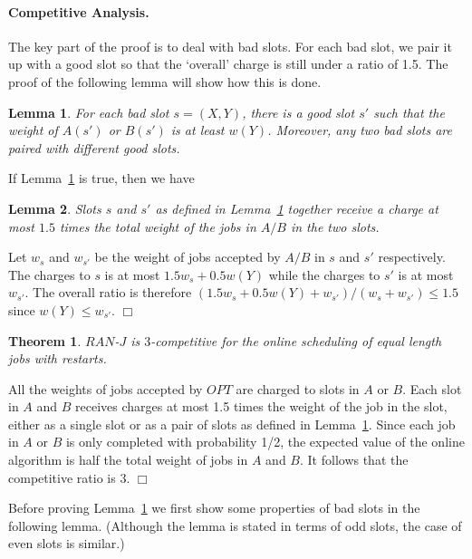 \documentclass[11pt]{article}
\newtheorem{theorem}{Theorem}[section]
\newtheorem{lemma}{Lemma}[section]
\newcommand{\qed}{\hspace*{\fill}$\Box$\par\medskip}
\newenvironment{proof}{\noindent{\it Proof. }\ignorespaces}{\qed}
\begin{document}
\paragraph{Competitive Analysis.}

The key part of the proof is to deal with bad slots.
For each bad slot, we pair it up with a good slot 
so that the `overall' charge is still under a ratio of 1.5.
The proof of the following lemma will show how this is done. 


\begin{lemma} \label{lem:match-slots}
For each bad slot $s=(X,Y)$, there is a good slot $s'$ such that 
the weight of $A(s')$ or $B(s')$ is at least $w(Y)$.  
Moreover, any two bad slots are paired with different good slots.
\end{lemma}

If Lemma~\ref{lem:match-slots} is true, then we have

\begin{lemma}
Slots $s$ and $s'$ as defined in Lemma~\ref{lem:match-slots} together 
receive a charge at most $1.5$ times the total weight of the jobs in $A/B$
in the two slots.
\end{lemma}
\begin{proof}
Let $w_s$ and $w_{s'}$ be the weight of jobs accepted by $A/B$ in $s$ and $s'$
respectively.
The charges to $s$ is at most $1.5w_s + 0.5w(Y)$ while the charges to $s'$
is at most $w_{s'}$.  The overall ratio is therefore
$(1.5w_s + 0.5w(Y) + w_{s'})/(w_s + w_{s'}) \le 1.5$
since $w(Y) \le w_{s'}$. 
\end{proof}

\begin{theorem}
$RAN$-$J$ is $3$-competitive for the online scheduling of equal length jobs 
with restarts.
\end{theorem}
\begin{proof}
All the weights of jobs accepted by $OPT$ 
are charged to slots in $A$ or $B$.
Each slot in $A$ and $B$ receives charges at most 1.5 times the weight
of the job in the slot,
either as a single slot or as a pair of slots as defined in 
Lemma~\ref{lem:match-slots}.  
Since each job in $A$ or $B$ is only completed 
with probability 1/2, the expected value of the online algorithm is half the
total weight of jobs in $A$ and $B$.  
It follows that the competitive ratio is 3. 
\end{proof}

Before proving Lemma~\ref{lem:match-slots}
we first show some properties of bad slots in the following
lemma.  (Although the lemma is stated in terms of odd slots,
the case of even slots is similar.)
\end{document}
